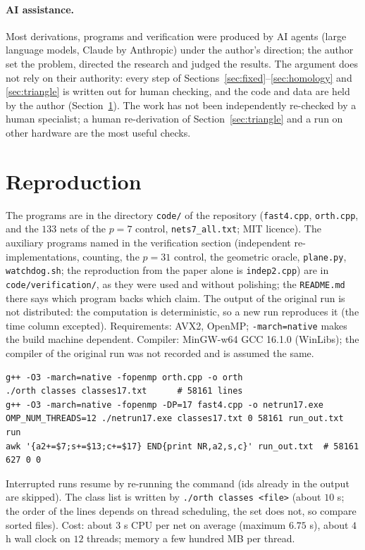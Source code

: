 \documentclass[11pt,a4paper]{article}
\theoremstyle{definition}
\begin{document}
\paragraph{AI assistance.} Most derivations, programs and verification were produced by AI agents (large language models, Claude by Anthropic) under the author's direction; the author set the problem, directed the research and judged the results. The argument does not rely on their authority: every step of Sections~\ref{sec:fixed}--\ref{sec:homology} and \ref{sec:triangle} is written out for human checking, and the code and data are held by the author (Section~\ref{sec:repro}). The work has not been independently re-checked by a human specialist; a human re-derivation of Section~\ref{sec:triangle} and a run on other hardware are the most useful checks.

\appendix
\section{Reproduction}\label{sec:repro}

The programs are in the directory \texttt{code/} of the repository (\texttt{fast4.cpp}, \texttt{orth.cpp}, and the $133$ nets of the $p=7$ control, \texttt{nets7\_all.txt}; MIT licence). The auxiliary programs named in the verification section (independent re-implementations, counting, the $p=31$ control, the geometric oracle, \texttt{plane.py}, \texttt{watchdog.sh}; the reproduction from the paper alone is \texttt{indep2.cpp}) are in \texttt{code/verification/}, as they were used and without polishing; the \texttt{README.md} there says which program backs which claim. The output of the original run is not distributed: the computation is deterministic, so a new run reproduces it (the time column excepted). Requirements: AVX2, OpenMP; \texttt{-march=native} makes the build machine dependent. Compiler: MinGW-w64 GCC 16.1.0 (WinLibs); the compiler of the original run was not recorded and is assumed the same.
\begin{verbatim}
g++ -O3 -march=native -fopenmp orth.cpp -o orth
./orth classes classes17.txt      # 58161 lines
g++ -O3 -march=native -fopenmp -DP=17 fast4.cpp -o netrun17.exe
OMP_NUM_THREADS=12 ./netrun17.exe classes17.txt 0 58161 run_out.txt run
awk '{a2+=$7;s+=$13;c+=$17} END{print NR,a2,s,c}' run_out.txt  # 58161 627 0 0
\end{verbatim}
Interrupted runs resume by re-running the command (ids already in the output are skipped). The class list is written by \texttt{./orth classes <file>} (about $10$ s; the order of the lines depends on thread scheduling, the set does not, so compare sorted files). Cost: about $3$ s CPU per net on average (maximum $6.75$ s), about $4$ h wall clock on $12$ threads; memory a few hundred MB per thread.
\end{document}
